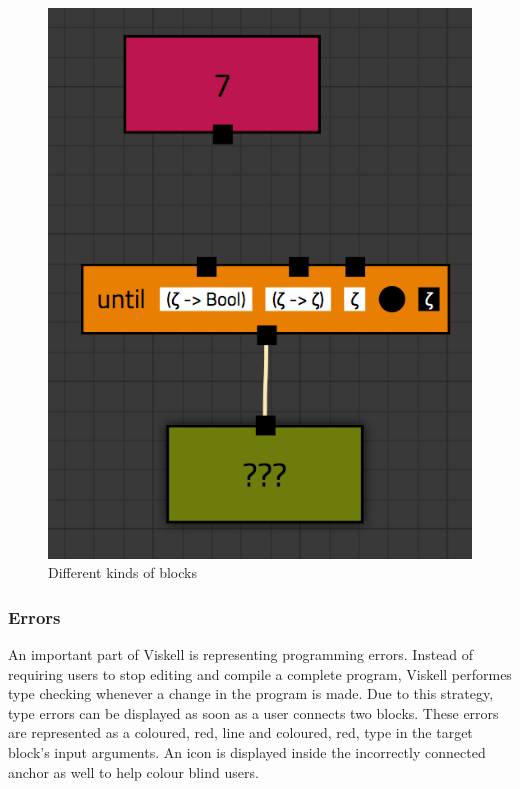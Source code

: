 \begin{figure}[p]
	\centering
	\includegraphics[scale=0.5]{Images/blocks-example}
	\caption{Different kinds of blocks}
	\label{fig:blocks-example}
\end{figure}

\subsubsection{Errors}

An important part of Viskell is representing programming errors.
Instead of requiring users to stop editing and compile a complete program, Viskell performes type checking whenever a change in the program is made. Due to this strategy, type errors can be displayed as soon as a user connects two blocks. These errors are represented as a coloured, red, line and coloured, red, type in the target block's input arguments. An icon is displayed inside the incorrectly connected anchor as well to help colour blind users.

